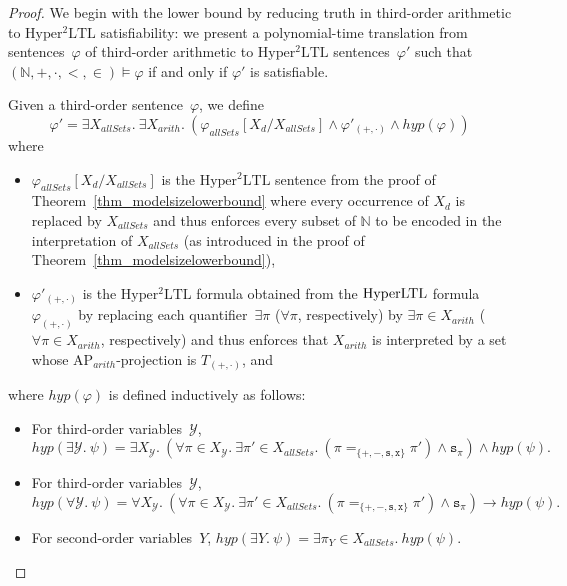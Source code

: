 \documentclass[dvipsnames,10pt,a4paper]{amsart}
\theoremstyle{definition}
\theoremstyle{remark}
\newcommand{\nats}{\mathbb{N}}
\renewcommand{\phi}{\varphi}
\newcommand{\set}[1]{\{#1\}}
\newcommand{\hyltl}{\mathrm{Hyper\-LTL}\xspace}
\newcommand{\sohyltl}{\mathrm{Hyper^2LTL}\xspace}
\newcommand{\ap}[0]{\mathrm{AP}}
\newcommand{\unidisvar}{X_d}
\newcommand{\posprop}{\mathtt{+}}
\newcommand{\negprop}{\mathtt{-}}
\newcommand{\setprop}{\mathtt{s}}
\newcommand{\inprop}{\mathtt{x}}
\newcommand{\plustimes}{{(+,\cdot)}}
\newcommand{\hyperize}{{\mathit{hyp}}}
\newcommand{\allsets}{{\mathit{allSets}}}
\newcommand{\arith}{\mathit{arith}}
\newcommand{\calY}{\mathcal{Y}}
\newcommand{\natsstruct}{(\nats, +, \cdot, <, \in)}
\newcommand{\equals}[3]{#1 =_{#3} #2}
\begin{document}
\begin{proof}
We begin with the lower bound by reducing truth in third-order arithmetic to $\sohyltl$ satisfiability: we present a polynomial-time translation from sentences~$\phi$ of third-order arithmetic to $\sohyltl$ sentences~$\phi'$ such that $\natsstruct \models \phi$ if and only if $\phi'$ is satisfiable.

Given a third-order sentence~$\phi$, we define \[\phi' = \exists X_\allsets.\ \exists X_\arith.\ (\phi_\allsets[\unidisvar/X_\allsets] \wedge \phi'_\plustimes \wedge \hyperize(\phi))\] where 
\begin{itemize}
    \item $\phi_\allsets[\unidisvar/X_\allsets]$ is the $\sohyltl$ sentence from the proof of Theorem~\ref{thm_modelsizelowerbound} where every occurrence of $\unidisvar$ is replaced by $X_\allsets$ and thus enforces every subset of $\nats$ to be encoded in the interpretation of $X_\allsets$ (as introduced in the proof of Theorem~\ref{thm_modelsizelowerbound}),
    \item $\phi'_\plustimes$ is the $\sohyltl$ formula obtained from the $\hyltl$ formula~$\phi_\plustimes$ by replacing each quantifier~$\exists \pi$ ($\forall \pi$, respectively) by $\exists \pi \in X_\arith$ ($\forall \pi \in X_\arith$, respectively) and thus enforces that $X_\arith$ is interpreted by a set whose $\ap_\arith$-projection is $T_\plustimes$, and
\end{itemize}
  where $\hyperize(\phi)$ is defined inductively as follows:
  
\begin{itemize}
    
    \item For third-order variables~$\calY$, \[\hyperize(\exists \calY.\ \psi) = \exists X_\calY.\ (\forall \pi \in X_\calY.\ \exists \pi' \in X_\allsets.\ (\equals{\pi}{\pi'}{\set{\posprop, \negprop,\setprop,\inprop}}) \wedge \setprop_{\pi}) \wedge \hyperize(\psi).\]
    
    \item For third-order variables~$\calY$, \[\hyperize(\forall \calY.\ \psi) = \forall X_\calY.\ (\forall \pi \in X_\calY.\  \exists \pi' \in X_\allsets.\ (\equals{\pi}{\pi'}{\set{\posprop, \negprop,\setprop,\inprop}}) \wedge \setprop_{\pi}) \rightarrow \hyperize(\psi).\]
    
    \item For second-order variables~$Y$, $\hyperize(\exists Y.\ \psi) = \exists \pi_Y \in X_\allsets.\  \hyperize(\psi)$.
    

\end{itemize}
\end{proof}
\end{document}
